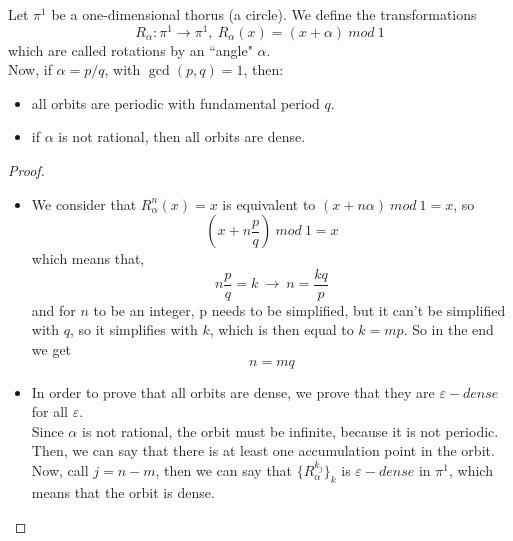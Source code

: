 Let $\pi^1$ be a one-dimensional thorus (a circle). We define the transformations 
$$
	R_\alpha : \pi^1 \rightarrow \pi^1, \ R_\alpha(x) = (x + \alpha) \ mod \ 1
$$
which are called rotations by an ``angle" $\alpha$. \\
Now, if $\alpha = p/q$, with $\gcd(p,q)=1$, then:
\begin{itemize}
	\item all orbits are periodic with fundamental period $q$. 
	\item if $\alpha$ is not rational, then all orbits are dense. 
\end{itemize}
\begin{proof}
	\begin{itemize}
		\item We consider that $R^n_\alpha(x)=x$ is equivalent to $(x + n\alpha) \ mod \ 1 = x$, so 
		$$ 
			\left(x + n\frac{p}{q}\right) \ mod \ 1 = x
		$$
		which means that, 
		$$
			n\frac{p}{q} = k \ \longrightarrow	\ n = \frac{kq}{p}
		$$
		and for $n$ to be an integer, p needs to be simplified, but it can't be simplified with $q$, so it simplifies with $k$, which is then equal to $k = mp$. So in the end we get
		$$
			n = mq
		$$
		\item In order to prove that all orbits are dense, we prove that they are $\varepsilon-dense$ for all $\varepsilon$. \\
		Since $\alpha$ is not rational, the orbit must be infinite, because it is not periodic. Then, we can say that there is at least one accumulation point in the orbit. \\
		Now, call $j = n - m$, then we can say that $\{R^{k_j}_\alpha\}_k$ is $\varepsilon-dense$ in $\pi^1$, which means that the orbit is dense.
	\end{itemize}
\end{proof}
